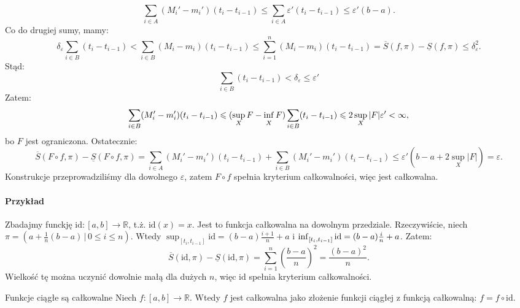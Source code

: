 \documentclass{article}
\numberwithin{defi}{section}
\numberwithin{defi}{section}
\newcommand{\R}{\mathbb{R}}
\newcommand{\oo}{\infty}
\newcommand{\id}{\text{id}}
\renewcommand{\inf}{\mathop{\mathrm{inf}\vphantom{\mathrm{sup}}}}
\newcommand{\Sd}{\underline{S}}
\newcommand{\Sg}{\overline{S}}
\newcommand{\przedz}[2]{[#1 _ {#2}, #1_{#2 - 1}]}
\providecommand{\eps}{\varepsilon}
\renewcommand{\leq}{\leqslant}
\begin{document}
\begin{dow}{}
\begin{equation*}
        \sum_{i \in A} (M_i' - m_i') (t_i - t_{i-1}) \leq \sum_{i \in A} \eps' (t_i - t_{i-1}) \leq \eps' (b- a).
    \end{equation*} Co do drugiej sumy, mamy: \begin{equation*}
        \delta_\eps \sum_{i \in B} (t_i - t_{i-1}) < \sum_{i \in B} (M_i - m_i)  (t_i - t_{i-1}) \leq \sum_{i = 1}^{n} (M_i - m_i)  (t_i - t_{i-1}) = \Sg(f, \pi) - \Sd(f, \pi) \leq \delta_\eps^2.
    \end{equation*} Stąd: \begin{equation*}
        \sum_{i \in B} (t_i - t_{i-1}) < \delta_\eps \leq \eps'
    \end{equation*} Zatem: \begin{equation*}
        \sum_{i \in B} (M_i' - m_i') (t_i - t_{i-1}) \leq (\sup_{X} F - \inf_{X} F) \sum_{i \in B} (t_i - t_{i-1}) \leq 2 \sup_{X} |F| \eps' < \oo,
    \end{equation*} bo $F$ jest ograniczona. Ostatecznie: \begin{equation*}
        \Sg(F \circ f, \pi) - \Sd(F \circ f, \pi)  =  \sum_{i \in A} (M_i' - m_i') (t_i - t_{i-1}) + \sum_{i \in B} (M_i' - m_i') (t_i - t_{i-1}) \leq \eps'( b- a + 2 \sup_X |F|) = \eps.
    \end{equation*} Konstrukcje przeprowadziliśmy dla dowolnego $\eps$, zatem $F \circ f$ spełnia kryterium całkowalności, więc jest całkowalna.
\end{dow}

\paragraph{Przykład} Zbadajmy funckję $\id: [a, b] \to \R$, t.ż. $\id(x) = x$. Jest to funkcja całkowalna na dowolnym przedziale. Rzeczywiście, niech $\pi = (a + \frac{1}{n}(b - a) \, | \, 0 \leq i \leq n)$. Wtedy $\sup_{\przedz{t}{i}} \id = (b - a) \frac{i +1}{n} + a$ i $\inf_{\przedz{t}{i}} \id = (b - a) \frac{i}{n} + a$. Zatem: \begin{equation}
    \Sg(\id, \pi) - \Sd(\id, \pi) = \sum_{i = 1}^{n} \left(\frac{b- a}{n}\right)^2 = \frac{(b - a)^2}{n}.
\end{equation} Wielkość tę można uczynić dowolnie małą dla dużych $n$, więc $\id$ spełnia kryterium całkowalności.

\begin{obs}{Funkcje ciągłe są całkowalne}
    Niech $f: [a, b] \to \R$. Wtedy $f$ jest całkowalna jako złożenie funkcji ciągłej z funkcją całkowalną: $f = f \circ \id$.
\end{obs}
\end{document}
